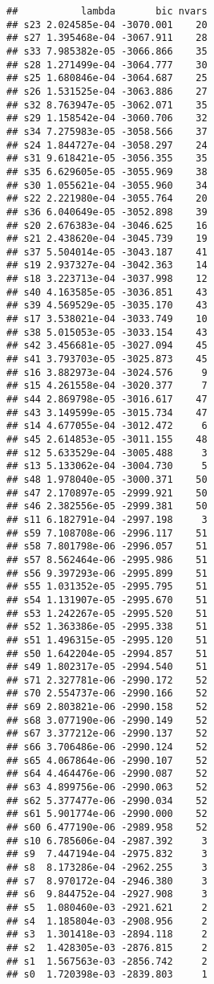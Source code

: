 \documentclass[
]{article}
\begin{document}
\begin{verbatim}
##           lambda       bic nvars
## s23 2.024585e-04 -3070.001    20
## s27 1.395468e-04 -3067.911    28
## s33 7.985382e-05 -3066.866    35
## s28 1.271499e-04 -3064.777    30
## s25 1.680846e-04 -3064.687    25
## s26 1.531525e-04 -3063.886    27
## s32 8.763947e-05 -3062.071    35
## s29 1.158542e-04 -3060.706    32
## s34 7.275983e-05 -3058.566    37
## s24 1.844727e-04 -3058.297    24
## s31 9.618421e-05 -3056.355    35
## s35 6.629605e-05 -3055.969    38
## s30 1.055621e-04 -3055.960    34
## s22 2.221980e-04 -3055.764    20
## s36 6.040649e-05 -3052.898    39
## s20 2.676383e-04 -3046.625    16
## s21 2.438620e-04 -3045.739    19
## s37 5.504014e-05 -3043.187    41
## s19 2.937327e-04 -3042.363    14
## s18 3.223713e-04 -3037.998    12
## s40 4.163585e-05 -3036.851    43
## s39 4.569529e-05 -3035.170    43
## s17 3.538021e-04 -3033.749    10
## s38 5.015053e-05 -3033.154    43
## s42 3.456681e-05 -3027.094    45
## s41 3.793703e-05 -3025.873    45
## s16 3.882973e-04 -3024.576     9
## s15 4.261558e-04 -3020.377     7
## s44 2.869798e-05 -3016.617    47
## s43 3.149599e-05 -3015.734    47
## s14 4.677055e-04 -3012.472     6
## s45 2.614853e-05 -3011.155    48
## s12 5.633529e-04 -3005.488     3
## s13 5.133062e-04 -3004.730     5
## s48 1.978040e-05 -3000.371    50
## s47 2.170897e-05 -2999.921    50
## s46 2.382556e-05 -2999.381    50
## s11 6.182791e-04 -2997.198     3
## s59 7.108708e-06 -2996.117    51
## s58 7.801798e-06 -2996.057    51
## s57 8.562464e-06 -2995.986    51
## s56 9.397293e-06 -2995.899    51
## s55 1.031352e-05 -2995.795    51
## s54 1.131907e-05 -2995.670    51
## s53 1.242267e-05 -2995.520    51
## s52 1.363386e-05 -2995.338    51
## s51 1.496315e-05 -2995.120    51
## s50 1.642204e-05 -2994.857    51
## s49 1.802317e-05 -2994.540    51
## s71 2.327781e-06 -2990.172    52
## s70 2.554737e-06 -2990.166    52
## s69 2.803821e-06 -2990.158    52
## s68 3.077190e-06 -2990.149    52
## s67 3.377212e-06 -2990.137    52
## s66 3.706486e-06 -2990.124    52
## s65 4.067864e-06 -2990.107    52
## s64 4.464476e-06 -2990.087    52
## s63 4.899756e-06 -2990.063    52
## s62 5.377477e-06 -2990.034    52
## s61 5.901774e-06 -2990.000    52
## s60 6.477190e-06 -2989.958    52
## s10 6.785606e-04 -2987.392     3
## s9  7.447194e-04 -2975.832     3
## s8  8.173286e-04 -2962.255     3
## s7  8.970172e-04 -2946.380     3
## s6  9.844752e-04 -2927.908     3
## s5  1.080460e-03 -2921.621     2
## s4  1.185804e-03 -2908.956     2
## s3  1.301418e-03 -2894.118     2
## s2  1.428305e-03 -2876.815     2
## s1  1.567563e-03 -2856.742     2
## s0  1.720398e-03 -2839.803     1
\end{verbatim}
\end{document}
